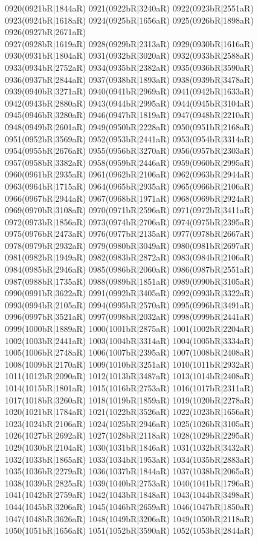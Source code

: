 0920(0921bR|1844aR) 0921(0922bR|3240aR) 0922(0923bR|2551aR) 0923(0924bR|1618aR) 0924(0925bR|1656aR) 0925(0926bR|1898aR) 0926(0927bR|2671aR) \\0927(0928bR|1619aR) 0928(0929bR|2313aR) 0929(0930bR|1616aR) 0930(0931bR|1804aR) 0931(0932bR|3020aR) 0932(0933bR|2588aR) 0933(0934bR|2752aR) 0934(0935bR|2382aR) 0935(0936bR|3590aR) \\0936(0937bR|2844aR) 0937(0938bR|1893aR) 0938(0939bR|3478aR) 0939(0940bR|3271aR) 0940(0941bR|2969aR) 0941(0942bR|1633aR) 0942(0943bR|2880aR) 0943(0944bR|2995aR) 0944(0945bR|3104aR) \\0945(0946bR|3280aR) 0946(0947bR|1819aR) 0947(0948bR|2210aR) 0948(0949bR|2601aR) 0949(0950bR|2228aR) 0950(0951bR|2168aR) 0951(0952bR|3569aR) 0952(0953bR|2441aR) 0953(0954bR|3314aR) \\0954(0955bR|2676aR) 0955(0956bR|3270aR) 0956(0957bR|2303aR) 0957(0958bR|3382aR) 0958(0959bR|2446aR) 0959(0960bR|2995aR) 0960(0961bR|2935aR) 0961(0962bR|2106aR) 0962(0963bR|2944aR) \\0963(0964bR|1715aR) 0964(0965bR|2935aR) 0965(0966bR|2106aR) 0966(0967bR|2944aR) 0967(0968bR|1971aR) 0968(0969bR|2924aR) 0969(0970bR|3108aR) 0970(0971bR|2596aR) 0971(0972bR|3411aR) \\0972(0973bR|1856aR) 0973(0974bR|2706aR) 0974(0975bR|2395aR) 0975(0976bR|2473aR) 0976(0977bR|2135aR) 0977(0978bR|2667aR) 0978(0979bR|2932aR) 0979(0980bR|3049aR) 0980(0981bR|2697aR) \\0981(0982bR|1949aR) 0982(0983bR|2872aR) 0983(0984bR|2106aR) 0984(0985bR|2946aR) 0985(0986bR|2060aR) 0986(0987bR|2551aR) 0987(0988bR|1735aR) 0988(0989bR|1851aR) 0989(0990bR|3105aR) \\0990(0991bR|3622aR) 0991(0992bR|3405aR) 0992(0993bR|3322aR) 0993(0994bR|2105aR) 0994(0995bR|2570aR) 0995(0996bR|3491aR) 0996(0997bR|3521aR) 0997(0998bR|2032aR) 0998(0999bR|2441aR) \\0999(1000bR|1889aR) 1000(1001bR|2875aR) 1001(1002bR|2204aR) 1002(1003bR|2441aR) 1003(1004bR|3314aR) 1004(1005bR|3334aR) 1005(1006bR|2748aR) 1006(1007bR|2395aR) 1007(1008bR|2408aR) \\1008(1009bR|2170aR) 1009(1010bR|3251aR) 1010(1011bR|2932aR) 1011(1012bR|2090aR) 1012(1013bR|3487aR) 1013(1014bR|2408aR) 1014(1015bR|1801aR) 1015(1016bR|2753aR) 1016(1017bR|2311aR) \\1017(1018bR|3260aR) 1018(1019bR|1859aR) 1019(1020bR|2278aR) 1020(1021bR|1784aR) 1021(1022bR|3526aR) 1022(1023bR|1656aR) 1023(1024bR|2106aR) 1024(1025bR|2946aR) 1025(1026bR|3105aR) \\1026(1027bR|2692aR) 1027(1028bR|2118aR) 1028(1029bR|2295aR) 1029(1030bR|2104aR) 1030(1031bR|1846aR) 1031(1032bR|3432aR) 1032(1033bR|1865aR) 1033(1034bR|1953aR) 1034(1035bR|2883aR) \\1035(1036bR|2279aR) 1036(1037bR|1844aR) 1037(1038bR|2065aR) 1038(1039bR|2825aR) 1039(1040bR|2753aR) 1040(1041bR|1796aR) 1041(1042bR|2759aR) 1042(1043bR|1848aR) 1043(1044bR|3498aR) \\1044(1045bR|3206aR) 1045(1046bR|2659aR) 1046(1047bR|1850aR) 1047(1048bR|3626aR) 1048(1049bR|3206aR) 1049(1050bR|2118aR) 1050(1051bR|1656aR) 1051(1052bR|3590aR) 1052(1053bR|2844aR) 